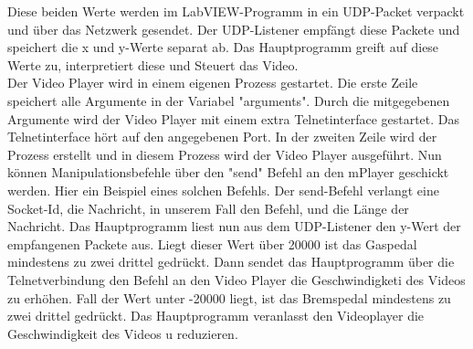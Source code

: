 Diese beiden Werte werden im LabVIEW-Programm in ein UDP-Packet verpackt und über das Netzwerk gesendet. Der UDP-Listener empfängt diese Packete und speichert die x und y-Werte separat ab. Das Hauptprogramm greift auf diese Werte zu, interpretiert diese und Steuert das Video.\\
Der Video Player wird in einem eigenen Prozess gestartet. 
Die erste Zeile speichert alle Argumente in der Variabel "arguments". Durch die mitgegebenen Argumente wird der Video Player mit einem extra Telnetinterface gestartet.  Das Telnetinterface hört auf den angegebenen Port. In der zweiten Zeile wird der Prozess erstellt und in diesem Prozess wird der Video Player ausgeführt. 
Nun können Manipulationsbefehle über den "send" Befehl an den mPlayer geschickt werden. Hier ein Beispiel eines solchen Befehls.
Der send-Befehl verlangt eine Socket-Id, die Nachricht,  in unserem Fall den Befehl, und die Länge der Nachricht. Das Hauptprogramm liest nun aus dem UDP-Listener den y-Wert der empfangenen Packete aus. Liegt dieser Wert über 20000 ist das Gaspedal mindestens zu zwei drittel gedrückt. Dann sendet das Hauptprogramm über die Telnetverbindung den Befehl an den Video Player die Geschwindigketi des Videos zu erhöhen. Fall der Wert unter -20000 liegt, ist das Bremspedal mindestens zu zwei drittel gedrückt. Das Hauptprogramm veranlasst den Videoplayer die Geschwindigkeit des Videos u reduzieren. 